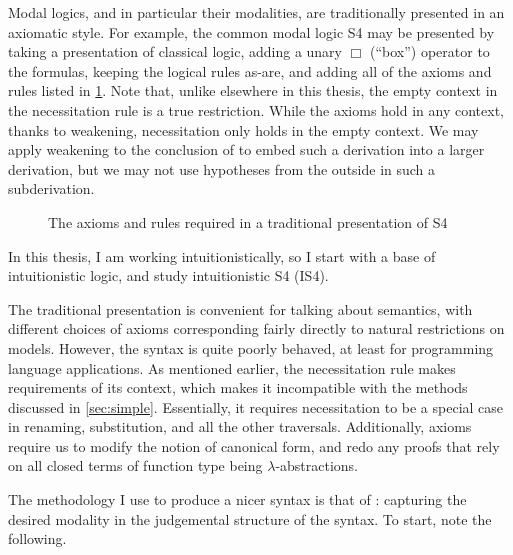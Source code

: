 Modal logics, and in particular their modalities, are traditionally presented in
an axiomatic style.
For example, the common modal logic S4 may be presented by taking a presentation
of classical logic, adding a unary $\Box$ (``box'') operator to the formulas,
keeping the logical rules as-are, and adding all of the axioms and rules
listed in \cref{fig:S4-axioms}.
Note that, unlike elsewhere in this thesis, the empty context in the
necessitation rule  is a true restriction.
While the axioms hold in any context, thanks to weakening, necessitation only
holds in the empty context.
We may apply weakening to the conclusion of  to embed such a
derivation into a larger derivation, but we may not use hypotheses from the
outside in such a subderivation.

\begin{figure}
  \caption{The axioms and rules required in a traditional presentation of S4}
  \label{fig:S4-axioms}
\end{figure}

In this thesis, I am working intuitionistically, so I start with a base of
intuitionistic logic, and study intuitionistic S4 (IS4).

The traditional presentation is convenient for talking about semantics, with
different choices of axioms corresponding fairly directly to natural
restrictions on models.
However, the syntax is quite poorly behaved, at least for programming language
applications.
As mentioned earlier, the necessitation rule makes requirements of its context,
which makes it incompatible with the methods discussed in \cref{sec:simple}.
Essentially, it requires necessitation to be a special case in renaming,
substitution, and all the other traversals.
Additionally, axioms require us to modify the notion of canonical form, and redo
any proofs that rely on all closed terms of function type being
$\lambda$-abstractions.

The methodology I use to produce a nicer syntax is that of \citet{judgmental}:
capturing the desired modality in the judgemental structure of the syntax.
To start, note the following.

